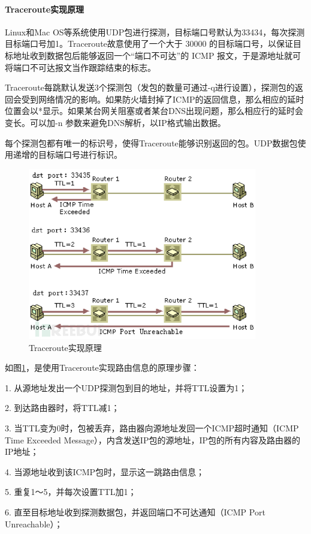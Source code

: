 \documentclass[a4paper,12pt]{report}
\begin{document}
\begin{spacing}{1.5}
\paragraph*{Traceroute实现原理}

Linux和Mac OS等系统使用UDP包进行探测，目标端口号默认为33434，每次探测目标端口号加1。Traceroute故意使用了一个大于 30000 的目标端口号，以保证目标地址收到数据包后能够返回一个“端口不可达”的 ICMP 报文，于是源地址就可将端口不可达报文当作跟踪结束的标志。

Traceroute每跳默认发送3个探测包（发包的数量可通过-q进行设置），探测包的返回会受到网络情况的影响。如果防火墙封掉了ICMP的返回信息，那么相应的延时位置会以*显示。如果某台网关阻塞或者某台DNS出现问题，那么相应行的延时会变长。可以加-n 参数来避免DNS解析，以IP格式输出数据。

每个探测包都有唯一的标识号，使得Traceroute能够识别返回的包。UDP数据包使用递增的目标端口号进行标识。

\begin{figure}[htb!]
  \centering
\includegraphics[width=10cm]{figure/traceroutes-why.jpeg}
\caption{Traceroute实现原理}
\label{pic:traceroute}
\end{figure}

如图\ref{pic:traceroute}，是使用Traceroute实现路由信息的原理步骤：

1. 从源地址发出一个UDP探测包到目的地址，并将TTL设置为1；

2. 到达路由器时，将TTL减1；

3. 当TTL变为0时，包被丢弃，路由器向源地址发回一个ICMP超时通知（ICMP Time Exceeded Message），内含发送IP包的源地址，IP包的所有内容及路由器的IP地址；

4. 当源地址收到该ICMP包时，显示这一跳路由信息；

5. 重复1～5，并每次设置TTL加1；

6. 直至目标地址收到探测数据包，并返回端口不可达通知（ICMP Port Unreachable）；


\end{spacing}
\end{document}
